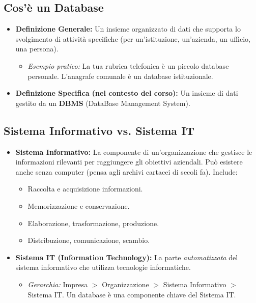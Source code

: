 	\subsection{Cos'è un Database}
	\begin{itemize}
		\item \textbf{Definizione Generale:} Un insieme organizzato di dati che supporta lo svolgimento di attività specifiche (per un'istituzione, un'azienda, un ufficio, una persona).
		\begin{itemize}
			\item \textit{Esempio pratico:} La tua rubrica telefonica è un piccolo database personale. L'anagrafe comunale è un database istituzionale.
		\end{itemize}
		\item \textbf{Definizione Specifica (nel contesto del corso):} Un insieme di dati gestito da un \textbf{DBMS} (DataBase Management System).
	\end{itemize}
	
	\subsection{Sistema Informativo vs. Sistema IT}
	\begin{itemize}
		\item \textbf{Sistema Informativo:} La componente di un'organizzazione che gestisce le informazioni rilevanti per raggiungere gli obiettivi aziendali. Può esistere anche senza computer (pensa agli archivi cartacei di secoli fa). Include:
		\begin{itemize}
			\item Raccolta e acquisizione informazioni.
			\item Memorizzazione e conservazione.
			\item Elaborazione, trasformazione, produzione.
			\item Distribuzione, comunicazione, scambio.
		\end{itemize}
		\item \textbf{Sistema IT (Information Technology):} La parte \textit{automatizzata} del sistema informativo che utilizza tecnologie informatiche.
		\begin{itemize}
			\item \textit{Gerarchia:} Impresa $>$ Organizzazione $>$ Sistema Informativo $>$ Sistema IT. Un database è una componente chiave del Sistema IT.
		\end{itemize}
	\end{itemize}
	
